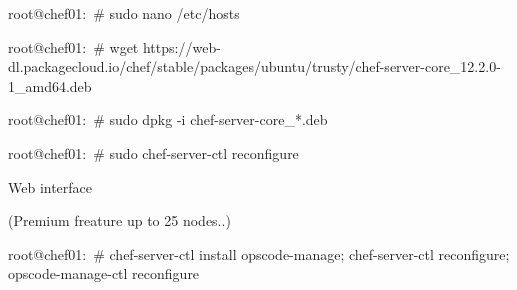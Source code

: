 
\begin{codelisting}
\label{code:}
\codecaption{}
\begin{code}
root@chef01:~# sudo nano /etc/hosts
\end{code}
\end{codelisting}


\begin{codelisting}
\label{code:}
\codecaption{}
\begin{code}
root@chef01:~# wget https://web-dl.packagecloud.io/chef/stable/packages/ubuntu/trusty/chef-server-core_12.2.0-1_amd64.deb
\end{code}
\end{codelisting}


\begin{codelisting}
\label{code:}
\codecaption{}
\begin{code}
root@chef01:~# sudo dpkg -i chef-server-core_*.deb
\end{code}
\end{codelisting}


\begin{codelisting}
\label{code:}
\codecaption{}
\begin{code}
root@chef01:~# sudo chef-server-ctl reconfigure
\end{code}
\end{codelisting}


Web interface


(Premium freature up to 25 nodes..)
\begin{codelisting}
\label{code:}
\codecaption{}
\begin{code}
root@chef01:~# chef-server-ctl install opscode-manage; chef-server-ctl reconfigure; opscode-manage-ctl reconfigure
\end{code}
\end{codelisting}


